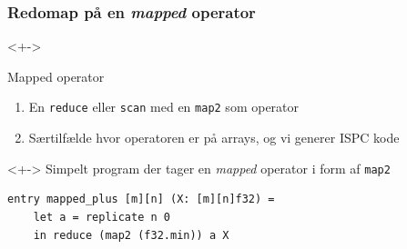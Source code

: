 \documentclass[t]{beamer}
\begin{document}
\begin{frame}[fragile]
  \frametitle{Redomap på en \textit{mapped} operator}
  \begin{onlyenv}<+->
    \begin{block}{Mapped operator}
      \begin{enumerate}
        \item En \texttt{reduce} eller \texttt{scan} med en \texttt{map2} som operator
        \item Særtilfælde hvor operatoren er på arrays, og vi generer ISPC kode
      \end{enumerate}
    \end{block}
  \end{onlyenv}
  \begin{onlyenv}<+->
    Simpelt program der tager en \textit{mapped} operator i form af \texttt{map2}
\begin{lstlisting}[language=futhark]
  entry mapped_plus [m][n] (X: [m][n]f32) =
    let a = replicate n 0
    in reduce (map2 (f32.min)) a X

\end{lstlisting}
  \end{onlyenv}
\end{frame}
\end{document}
